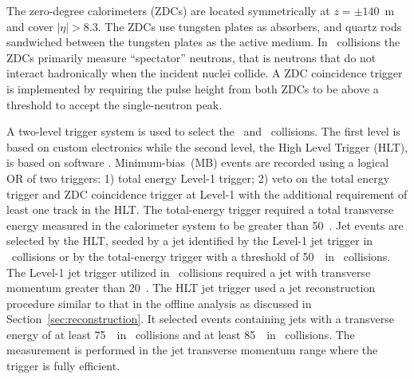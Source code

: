 The zero-degree calorimeters (ZDCs) are located symmetrically at $z = \pm140$~m and cover $|\eta| > 8.3$.
The ZDCs use tungsten plates as absorbers, and quartz rods sandwiched between the tungsten plates as the active medium. In \PbPb\ collisions the ZDCs primarily measure ``spectator'' neutrons, that is neutrons that do not interact
hadronically when the incident nuclei collide. A ZDC coincidence trigger is implemented by requiring
the pulse height from both ZDCs to be above a threshold to accept the single-neutron peak.

A two-level trigger system is used to select the \PbPb\ and \pp\ collisions. The first level is based on custom electronics while the second level, the High Level Trigger (HLT), is based on software \cite{Aaboud:2016leb}. 
Minimum-bias~(MB) events are recorded using a logical OR of two triggers: 1) total energy Level-1 trigger; 2) veto on the total energy trigger and ZDC coincidence trigger at Level-1 with the additional requirement of least one track in the HLT. The total-energy trigger required a total transverse energy measured in the calorimeter system to be greater than 50~\GeV.  Jet events are selected by the HLT, seeded by a jet identified by the Level-1 jet trigger in \pp\ collisions or by the total-energy trigger with a threshold of 50~\GeV\ in \PbPb\ collisions. The Level-1 jet trigger utilized in \pp\ collisions required a jet with transverse momentum greater than 20~\GeV.
The HLT jet trigger used a jet reconstruction procedure similar to that in the offline 
analysis as discussed in Section~\ref{sec:reconstruction}. 
It selected events containing jets with a transverse energy 
of at least 75~\GeV\ in \PbPb\ collisions and at least 
85~\GeV\ in \pp\ collisions. The measurement is performed in the 
jet transverse momentum range where the trigger is fully efficient.






